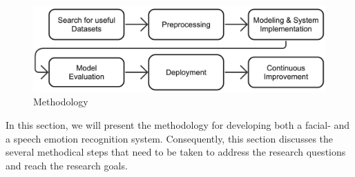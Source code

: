 \begin{figure}[h]
\centering
\includegraphics[width=\textwidth]{images/methodology2.png}
\caption{Methodology}\label{fig:methodology}
\end{figure}

\noindent 
In this section, we will present the methodology for developing both a facial- and a speech emotion recognition system. Consequently, this section discusses the several methodical steps that need to be taken to address the research questions and reach the research goals.


